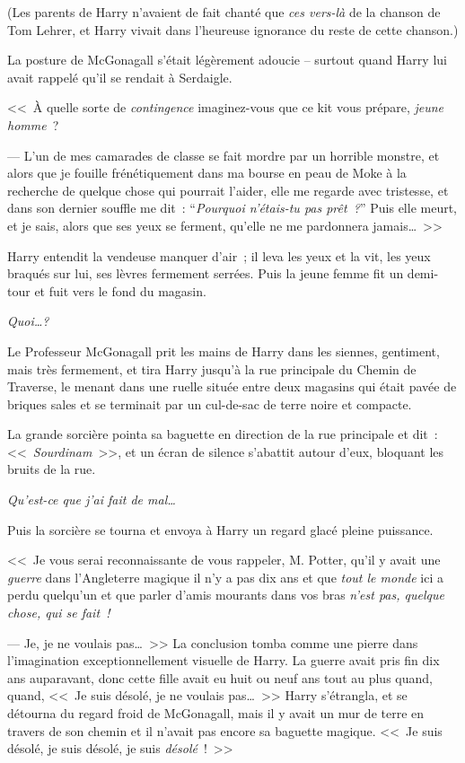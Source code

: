 (Les parents de Harry n'avaient de fait chanté que \emph{ces vers-là} de la chanson de Tom Lehrer, et Harry vivait dans l'heureuse ignorance du reste de cette chanson.)

La posture de McGonagall s'était légèrement adoucie -- surtout quand Harry lui avait rappelé qu'il se rendait à Serdaigle.

<<~À quelle sorte de \emph{contingence} imaginez-vous que ce kit vous prépare, \emph{jeune homme}~?

--- L'un de mes camarades de classe se fait mordre par un horrible monstre, et alors que je fouille frénétiquement dans ma bourse en peau de Moke à la recherche de quelque chose qui pourrait l'aider, elle me regarde avec tristesse, et dans son dernier souffle me dit~: “\emph{Pourquoi n'étais-tu pas prêt~?}” Puis elle meurt, et je sais, alors que ses yeux se ferment, qu'elle ne me pardonnera jamais…~>>

Harry entendit la vendeuse manquer d'air~; il leva les yeux et la vit, les yeux braqués sur lui, ses lèvres fermement serrées. Puis la jeune femme fit un demi-tour et fuit vers le fond du magasin.

\emph{Quoi…?}

Le Professeur McGonagall prit les mains de Harry dans les siennes, gentiment, mais très fermement, et tira Harry jusqu'à la rue principale du Chemin de Traverse, le menant dans une ruelle située entre deux magasins qui était pavée de briques sales et se terminait par un cul-de-sac de terre noire et compacte.

La grande sorcière pointa sa baguette en direction de la rue principale et dit~: <<~\emph{Sourdinam}~>>, et un écran de silence s'abattit autour d'eux, bloquant les bruits de la rue.

\emph{Qu'est-ce que j'ai fait de mal…}

Puis la sorcière se tourna et envoya à Harry un regard glacé pleine puissance.

<<~Je vous serai reconnaissante de vous rappeler, M. Potter, qu'il y avait une \emph{guerre} dans l'Angleterre magique il n'y a pas dix ans et que \emph{tout le monde} ici a perdu quelqu'un et que parler d'amis mourants dans vos bras \emph{n'est pas, quelque chose, qui se fait~!}

--- Je, je ne voulais pas…~>> La conclusion tomba comme une pierre dans l'imagination exceptionnellement visuelle de Harry. La guerre avait pris fin dix ans auparavant, donc cette fille avait eu huit ou neuf ans tout au plus quand, quand, <<~Je suis désolé, je ne voulais pas…~>> Harry s'étrangla, et se détourna du regard froid de McGonagall, mais il y avait un mur de terre en travers de son chemin et il n'avait pas encore sa baguette magique. <<~Je suis désolé, je suis désolé, je suis \emph{désolé}~!~>>

